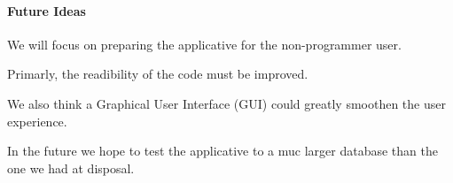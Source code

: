 \documentclass[11pt,twocolumn]{article}
\begin{document}
\paragraph{Future Ideas} 

We will focus on preparing the applicative for the non-programmer user.

Primarly, the readibility of the code must be improved.

We also think a Graphical User Interface (GUI) could greatly smoothen the user experience. 

In the future we hope to test the applicative to a muc larger database than the one we had at disposal.

\twocolumn[
\begin{@twocolumnfalse}
 

\end{@twocolumnfalse}
]
\end{document}

